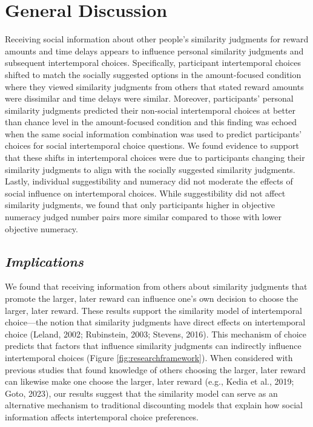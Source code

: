 \documentclass[
  pub,floatsintext]{apa6}
\begin{document}
\hypertarget{general-discussion}{%
\section{General Discussion}\label{general-discussion}}

Receiving social information about other people's similarity judgments for reward amounts and time delays appears to influence personal similarity judgments and subsequent intertemporal choices. Specifically, participant intertemporal choices shifted to match the socially suggested options in the amount-focused condition where they viewed similarity judgments from others that stated reward amounts were dissimilar and time delays were similar. Moreover, participants' personal similarity judgments predicted their non-social intertemporal choices at better than chance level in the amount-focused condition and this finding was echoed when the same social information combination was used to predict participants' choices for social intertemporal choice questions. We found evidence to support that these shifts in intertemporal choices were due to participants changing their similarity judgments to align with the socially suggested similarity judgments. Lastly, individual suggestibility and numeracy did not moderate the effects of social influence on intertemporal choices. While suggestibility did not affect similarity judgments, we found that only participants higher in objective numeracy judged number pairs more similar compared to those with lower objective numeracy.

\hypertarget{implications}{%
\subsection{\texorpdfstring{\emph{Implications}}{Implications}}\label{implications}}

We found that receiving information from others about similarity judgments that promote the larger, later reward can influence one's own decision to choose the larger, later reward. These results support the similarity model of intertemporal choice---the notion that similarity judgments have direct effects on intertemporal choice (Leland, 2002; Rubinstein, 2003; Stevens, 2016). This mechanism of choice predicts that factors that influence similarity judgments can indirectly influence intertemporal choices (Figure \ref{fig:researchframework}). When considered with previous studies that found knowledge of others choosing the larger, later reward can likewise make one choose the larger, later reward (e.g., Kedia et al., 2019; Goto, 2023), our results suggest that the similarity model can serve as an alternative mechanism to traditional discounting models that explain how social information affects intertemporal choice preferences.
\end{document}
